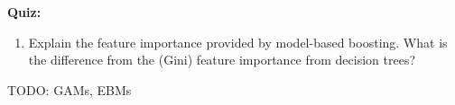 \textbf{Quiz:}
\begin{enumerate}
   	\item Explain the feature importance provided by model-based boosting. What is the difference from the (Gini) feature importance from decision trees?
   	
\end{enumerate}

TODO: GAMs, EBMs

